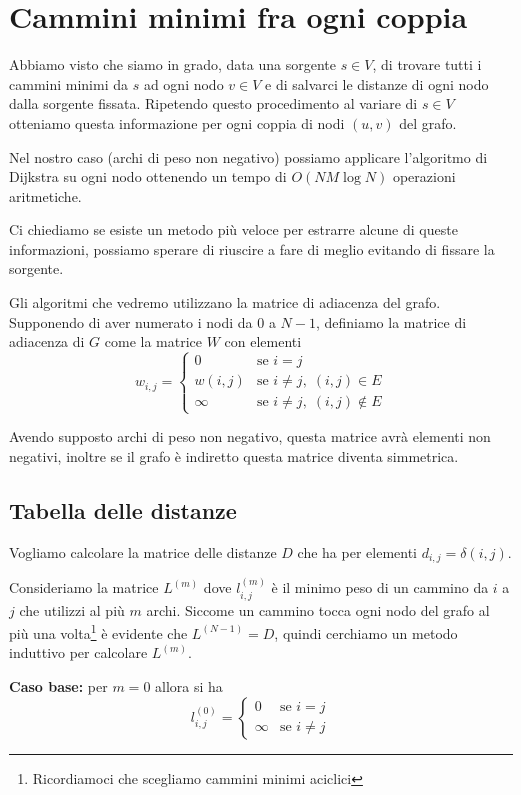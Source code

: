 \documentclass[a4paper,10pt]{amsbook}
\theoremstyle{plain}
\theoremstyle{definition}
\theoremstyle{remark}
\newcommand{\pa}[1]{\left(#1\right)}
\begin{document}
\section{Cammini minimi fra ogni coppia}

Abbiamo visto che siamo in grado, data una sorgente $s\in V$, di
trovare tutti i cammini minimi da $s$ ad ogni nodo $v\in V$ e di
salvarci le distanze di ogni nodo dalla sorgente fissata. Ripetendo
questo procedimento al variare di $s\in V$ otteniamo questa
informazione per ogni coppia di nodi $(u,v)$ del grafo.

Nel nostro caso (archi di peso non negativo) possiamo applicare
l'algoritmo di Dijkstra su ogni nodo ottenendo un tempo di $O(NM\log
N)$ operazioni aritmetiche.

Ci chiediamo se esiste un metodo più veloce per estrarre alcune di
queste informazioni, possiamo sperare di riuscire a fare di meglio
evitando di fissare la sorgente.

Gli algoritmi che vedremo utilizzano la matrice di adiacenza del
grafo. Supponendo di aver numerato i nodi da $0$ a $N-1$, definiamo la
matrice di adiacenza di $G$ come la matrice $W$ con elementi
\[
  w_{i,j} = \left\{
    \begin{matrix}
      0 & \text{se } i = j \\
      w\pa{i,j} & \text{se } i\neq j,\; (i,j) \in E \\
      \infty & \text{se } i\neq j,\; (i,j) \not\in E
    \end{matrix}
  \right.
\]

Avendo supposto archi di peso non negativo, questa matrice avrà
elementi non negativi, inoltre se il grafo è indiretto questa matrice
diventa simmetrica.

\subsection{Tabella delle distanze}

Vogliamo calcolare la matrice delle distanze $D$ che ha per elementi
$d_{i,j} = \delta(i,j)$.

Consideriamo la matrice $L^{(m)}$ dove $l^{(m)}_{i,j}$ è il minimo
peso di un cammino da $i$ a $j$ che utilizzi al più $m$ archi. Siccome
un cammino tocca ogni nodo del grafo al pi\`u una
volta\footnote{Ricordiamoci che scegliamo cammini minimi aciclici} \`e
evidente che $L^{(N-1)} = D$, quindi cerchiamo un metodo induttivo per
calcolare $L^{(m)}$.

\textbf{Caso base:} per $m=0$ allora si ha
\[ l^{(0)} _{i,j} = \left\{
  \begin{matrix}
    0 & \text{se } i = j\\
    \infty & \text{se } i \neq j
  \end{matrix}
  \right.
\]
\end{document}
